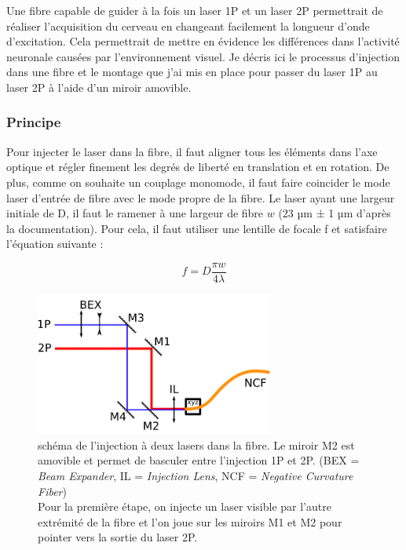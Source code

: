 
Une fibre capable de guider à la fois un laser 1P et un laser 2P permettrait de réaliser l'acquisition du cerveau en changeant facilement la longueur d'onde d'excitation. Cela permettrait de mettre en évidence les différences dans l'activité neuronale causées par l'environnement visuel. Je décris ici le processus d'injection dans une fibre et le montage que j'ai mis en place pour passer du laser 1P au laser 2P à l'aide d'un miroir amovible. 

\subsubsection{Principe}

Pour injecter le laser dans la fibre, il faut aligner tous les éléments dans l'axe optique et régler finement les degrés de liberté en translation et en rotation. De plus, comme on souhaite un couplage monomode, il faut faire coincider le mode laser d'entrée de fibre avec le mode propre de la fibre. Le laser ayant une largeur initiale de D, il faut le ramener à une largeur de fibre $w$ (23 µm ± 1 µm d'après la documentation). Pour cela, il faut utiliser une lentille de focale f et satisfaire l'équation suivante :

$$
f = D\frac{\pi w}{4\lambda}
$$

\begin{figure}
\centering
\includegraphics[width=0.7\textwidth]{./files/injection.svg.png}
\caption{schéma de l'injection à deux lasers dans la fibre. Le miroir M2 est amovible et permet de basculer entre l'injection 1P et 2P. (BEX = \emph{Beam Expander}, IL = \emph{Injection Lens}, NCF = \emph{Negative Curvature Fiber})
\\ Pour la première étape, on injecte un laser visible par l'autre extrémité de la fibre et l'on joue sur les miroirs M1 et M2 pour pointer vers la sortie du laser 2P.
\label{FIGinjection}}
\end{figure}


